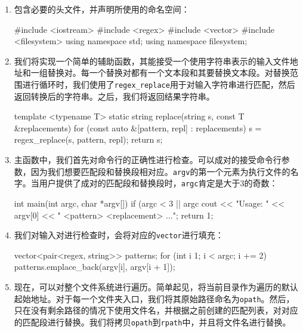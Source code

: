 \begin{enumerate}
\item 包含必要的头文件，并声明所使用的命名空间：

\begin{codebox}[cpp]
#include <iostream>
#include <regex>
#include <vector>
#include <filesystem>
using namespace std;
using namespace filesystem;
\end{codebox}

\item 我们将实现一个简单的辅助函数，其能接受一个使用字符串表示的输入文件地址和一组替换对。每一个替换对都有一个文本段和其要替换文本段。对替换范围进行循环时，我们使用了\texttt{regex\_replace}用于对输入字符串进行匹配，然后返回转换后的字符串。之后，我们将返回结果字符串。

\begin{codebox}[cpp]
template <typename T>
static string replace(string s, const T &replacements)
{
    for (const auto &[pattern, repl] : replacements) {
        s = regex_replace(s, pattern, repl);
    }
    return s;
}
\end{codebox}

\item 主函数中，我们首先对命令行的正确性进行检查。可以成对的接受命令行参数，因为我们想要匹配段和替换段相对应。\texttt{argv}的第一个元素为执行文件的名字。当用户提供了成对的匹配段和替换段时，\texttt{argc}肯定是大于3的奇数：

\begin{codebox}[cpp]
int main(int argc, char *argv[])
{
    if (argc < 3 || argc %
        cout << "Usage: " << argv[0]
             << " <pattern> <replacement> ...\n";
        return 1;
    }
\end{codebox}

\item 我们对输入对进行检查时，会将对应的\texttt{vector}进行填充：

\begin{codebox}[cpp]
vector<pair<regex, string>> patterns;
for (int i {1}; i < argc; i += 2) {
    patterns.emplace_back(argv[i], argv[i + 1]);
}
\end{codebox}

\item 现在，可以对整个文件系统进行遍历。简单起见，将当前目录作为遍历的默认起始地址。对于每一个文件夹入口，我们将其原始路径命名为\texttt{opath}。然后，只在没有剩余路径的情况下使用文件名，并根据之前创建的匹配列表，对对应的匹配段进行替换。我们将拷贝\texttt{opath}到\texttt{rpath}中，并且将文件名进行替换。


\end{enumerate}

